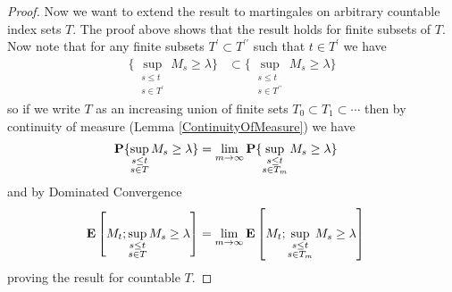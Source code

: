 \begin{proof}
Now we want to extend the result to martingales on arbitrary countable
index sets $T$.  The proof above shows that the result holds for
finite subsets of $T$.  Now note that for any finite subsets $T^\prime
\subset T^{\prime\prime}$ such that $t \in T^\prime$ we have 
\begin{align*}
\lbrace \sup_{\substack{s \leq t\\
s \in T^\prime}} M_s \geq \lambda  \rbrace &\subset
\lbrace \sup_{\substack{s \leq t\\
s \in T^{\prime\prime}}} M_s \geq \lambda  \rbrace
\end{align*}
so if we write $T$ as an increasing union of finite sets $T_0 \subset
T_1 \subset \cdots$ then by continuity of measure (Lemma
\ref{ContinuityOfMeasure}) we have 
\begin{align*}
\textbf{P}\{\sup_{\substack{s \leq t \\ s \in T}} M_s \geq \lambda\}
&= 
\lim_{m \to \infty} \textbf{P}\{\sup_{\substack{s \leq t \\
s \in T_m}}  M_s \geq \lambda\} 
\end{align*}
and by Dominated Convergence 
\begin{align*}
\textbf{E}\left[M_t ; \sup_{\substack{s \leq t \\ s \in T}} M_s  \geq \lambda\right] &= 
\lim_{m \to \infty} \textbf{E}\left[M_t ; \sup_{\substack{s \leq t \\ s
      \in T_m}} M_s  \geq \lambda\right]
\end{align*}
proving the result for countable $T$.
\end{proof}

